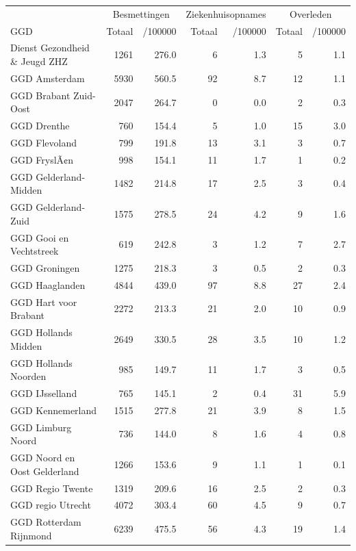 \documentclass[
  english,
  man,floatsintext]{apa6}
\begin{document}
\begin{table}[H]
\centering\begingroup\fontsize{10}{12}\selectfont

\begin{threeparttable}
\begin{tabular}{lrrrrrr}
\toprule
\multicolumn{1}{c}{ } & \multicolumn{2}{c}{Besmettingen} & \multicolumn{2}{c}{Ziekenhuisopnames} & \multicolumn{2}{c}{Overleden} \\
\cmidrule(l{3pt}r{3pt}){2-3} \cmidrule(l{3pt}r{3pt}){4-5} \cmidrule(l{3pt}r{3pt}){6-7}
GGD & Totaal & /100000 & Totaal & /100000 & Totaal & /100000\\
\midrule
Dienst Gezondheid \& Jeugd ZHZ & 1261 & 276.0 & 6 & 1.3 & 5 & 1.1\\
GGD Amsterdam & 5930 & 560.5 & 92 & 8.7 & 12 & 1.1\\
GGD Brabant Zuid-Oost & 2047 & 264.7 & 0 & 0.0 & 2 & 0.3\\
GGD Drenthe & 760 & 154.4 & 5 & 1.0 & 15 & 3.0\\
GGD Flevoland & 799 & 191.8 & 13 & 3.1 & 3 & 0.7\\
GGD FryslÃ¢n & 998 & 154.1 & 11 & 1.7 & 1 & 0.2\\
GGD Gelderland-Midden & 1482 & 214.8 & 17 & 2.5 & 3 & 0.4\\
GGD Gelderland-Zuid & 1575 & 278.5 & 24 & 4.2 & 9 & 1.6\\
GGD Gooi en Vechtstreek & 619 & 242.8 & 3 & 1.2 & 7 & 2.7\\
GGD Groningen & 1275 & 218.3 & 3 & 0.5 & 2 & 0.3\\
GGD Haaglanden & 4844 & 439.0 & 97 & 8.8 & 27 & 2.4\\
GGD Hart voor Brabant & 2272 & 213.3 & 21 & 2.0 & 10 & 0.9\\
GGD Hollands Midden & 2649 & 330.5 & 28 & 3.5 & 10 & 1.2\\
GGD Hollands Noorden & 985 & 149.7 & 11 & 1.7 & 3 & 0.5\\
GGD IJsselland & 765 & 145.1 & 2 & 0.4 & 31 & 5.9\\
GGD Kennemerland & 1515 & 277.8 & 21 & 3.9 & 8 & 1.5\\
GGD Limburg Noord & 736 & 144.0 & 8 & 1.6 & 4 & 0.8\\
GGD Noord en Oost Gelderland & 1266 & 153.6 & 9 & 1.1 & 1 & 0.1\\
GGD Regio Twente & 1319 & 209.6 & 16 & 2.5 & 2 & 0.3\\
GGD regio Utrecht & 4072 & 303.4 & 60 & 4.5 & 9 & 0.7\\
GGD Rotterdam Rijnmond & 6239 & 475.5 & 56 & 4.3 & 19 & 1.4\\

\end{tabular}
\end{threeparttable}
\end{table}
\end{document}
